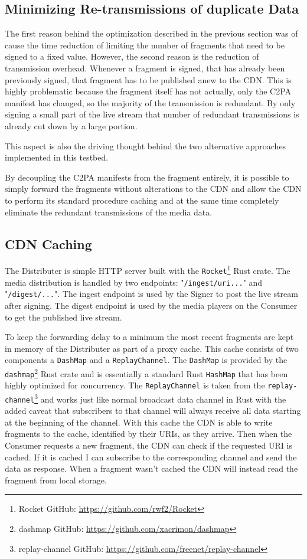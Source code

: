\subsection{Minimizing Re-transmissions of duplicate Data}

The first reason behind the optimization described in the previous section was of cause the time reduction of limiting the number of fragments that need to be signed to a fixed value. However, the second reason is the reduction of transmission overhead. Whenever a fragment is signed, that has already been previously signed, that fragment has to be published anew to the CDN. This is highly problematic because the fragment itself has not actually, only the C2PA manifest has changed, so the majority of the transmission is redundant. By only signing a small part of the live stream that number of redundant transmissions is already cut down by a large portion.

This aspect is also the driving thought behind the two alternative approaches implemented in this testbed.

By decoupling the C2PA manifests from the fragment entirely, it is possible to simply forward the fragments without alterations to the CDN and allow the CDN to perform its standard procedure caching and at the same time completely eliminate the redundant transmissions of the media data.

\subsection{CDN Caching}

The Distributer is simple HTTP server built with the \texttt{Rocket}\footnote{Rocket GitHub: \url{https://github.com/rwf2/Rocket}} Rust crate. The media distribution is handled by two endpoints: "\texttt{/ingest/uri...}" and "\texttt{/digest/...}". The ingest endpoint is used by the Signer to post the live stream after signing. The digest endpoint is used by the media players on the Consumer to get the published live stream.

To keep the forwarding delay to a minimum the most recent fragments are kept in memory of the Distributer as part of a proxy cache. This cache consists of two components a \texttt{DashMap} and a \texttt{ReplayChannel}. The \texttt{DashMap} is provided by the \texttt{dashmap}\footnote{dashmap GitHub: \url{https://github.com/xacrimon/dashmap}} Rust crate and is essentially a standard Rust \texttt{HashMap} that has been highly optimized for concurrency. The \texttt{ReplayChannel} is taken from the \texttt{replay-channel}\footnote{replay-channel GitHub: \url{https://github.com/freenet/replay-channel}} and works just like normal broadcast data channel in Rust with the added caveat that subscribers to that channel will always receive all data starting at the beginning of the channel. With this cache the CDN is able to write fragments to the cache, identified by their URIs, as they arrive. Then when the Consumer requests a new fragment, the CDN can check if the requested URI is cached. If it is cached I can subscribe to the corresponding channel and send the data as response. When a fragment wasn't cached the CDN will instead read the fragment from local storage.

